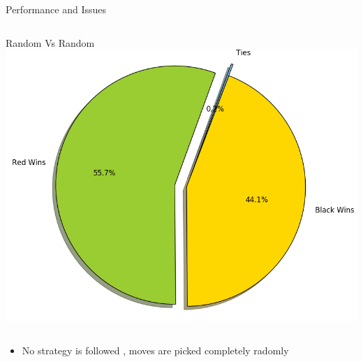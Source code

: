 \documentclass[aspectratio=169]{beamer}
\begin{document}
\begin{frame}{Performance and Issues}
  \begin{columns}
	 	\begin{column}{0.4\textwidth}
			Random Vs Random
			\centering
			\includegraphics[scale = 0.35]{randVsrand.png}
	 	\end{column}
	\end{columns} 	

		
	\begin{itemize}
 		\item No strategy is followed , moves are picked completely radomly 
	\end{itemize}

\end{frame}
\end{document}

